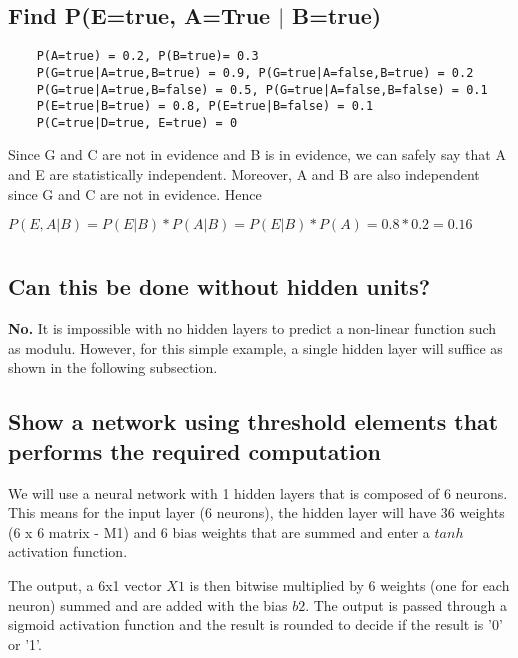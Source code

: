 \documentclass{article}                     %
\begin{document}
	\subsection{Find P(E=true, A=True $ | $ B=true)}
	\begin{verbatim}
	P(A=true) = 0.2, P(B=true)= 0.3
	P(G=true|A=true,B=true) = 0.9, P(G=true|A=false,B=true) = 0.2
	P(G=true|A=true,B=false) = 0.5, P(G=true|A=false,B=false) = 0.1
	P(E=true|B=true) = 0.8, P(E=true|B=false) = 0.1
	P(C=true|D=true, E=true) = 0
	\end{verbatim}
	
	Since G and C are not in evidence and B is in evidence, we can safely say that A and E are statistically independent. Moreover, A and B are also independent since G and C are not in evidence. Hence
	
	$ P(E, A | B) =P(E|B)*P(A|B)=P(E|B)*P(A)=0.8 * 0.2 = 0.16 $
	
	
	\section{}
	\subsection{Can this be done without hidden units?}
	\textbf{No.} It is impossible with no hidden layers to predict a non-linear function such as modulu. However, for this simple example, a single hidden layer will suffice as shown in the following subsection.
	
	\subsection{Show a network using threshold elements that performs the required computation}
	We will use a neural network with 1 hidden layers that is composed of 6 neurons. This means for the input layer (6 neurons), the hidden layer will have 36 weights (6 x 6 matrix - M1) and 6 bias weights that are summed and enter a $ tanh $ activation function. 
	
	The output, a 6x1 vector $ X1 $ is then bitwise multiplied by 6 weights (one for each neuron) summed and are added with the bias $ b2 $. The output is passed through a sigmoid activation function and the result is rounded to decide if the result is '0' or '1'.
	
\end{document}
